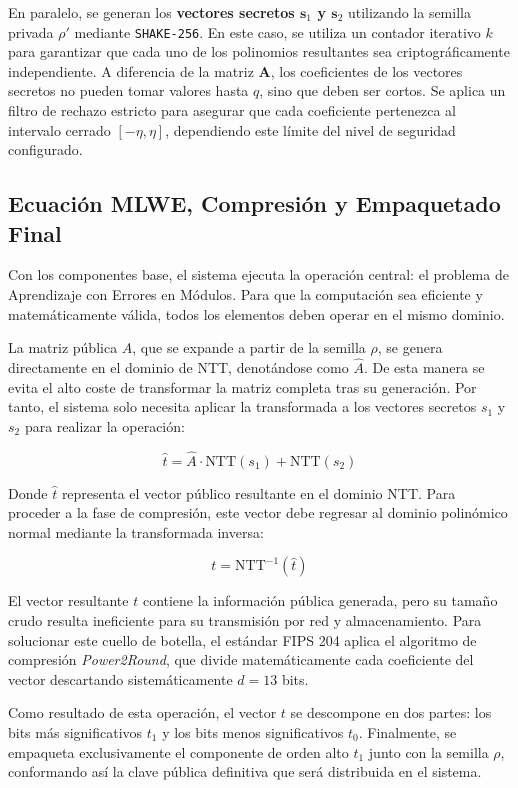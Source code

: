 \documentclass[11pt, a4paper]{report}
\theoremstyle{definition}
\begin{document}
En paralelo, se generan los \textbf{vectores secretos $\mathbf{s}_1$ y $\mathbf{s}_2$} utilizando la semilla privada $\rho'$ mediante \texttt{SHAKE-256}. En este caso, se utiliza un contador iterativo $k$ para garantizar que cada uno de los polinomios resultantes sea criptográficamente independiente. A diferencia de la matriz $\mathbf{A}$, los coeficientes de los vectores secretos no pueden tomar valores hasta $q$, sino que deben ser cortos. Se aplica un filtro de rechazo estricto para asegurar que cada coeficiente pertenezca al intervalo cerrado $[-\eta, \eta]$, dependiendo este límite del nivel de seguridad configurado.

\subsection{Ecuación MLWE, Compresión y Empaquetado Final}
\label{subsubsec:mlwe_empaquetado}

Con los componentes base, el sistema ejecuta la operación central: el problema de Aprendizaje con Errores en Módulos. Para que la computación sea eficiente y matemáticamente válida, todos los elementos deben operar en el mismo dominio.

La matriz pública $A$, que se expande a partir de la semilla $\rho$, se genera directamente en el dominio de NTT, denotándose como $\hat{A}$. De esta manera se evita el alto coste de transformar la matriz completa tras su generación. Por tanto, el sistema solo necesita aplicar la transformada a los vectores secretos $s_1$ y $s_2$ para realizar la operación:

\[ \hat{t} = \hat{A} \cdot \text{NTT}(s_1) + \text{NTT}(s_2) \]

Donde $\hat{t}$ representa el vector público resultante en el dominio NTT. Para proceder a la fase de compresión, este vector debe regresar al dominio polinómico normal mediante la transformada inversa:

\[ t = \text{NTT}^{-1}(\hat{t}) \]

El vector resultante $t$ contiene la información pública generada, pero su tamaño crudo resulta ineficiente para su transmisión por red y almacenamiento. Para solucionar este cuello de botella, el estándar FIPS 204 aplica el algoritmo de compresión \textit{Power2Round}, que divide matemáticamente cada coeficiente del vector descartando sistemáticamente $d = 13$ bits.

Como resultado de esta operación, el vector $t$ se descompone en dos partes: los bits más significativos $t_1$ y los bits menos significativos $t_0$. Finalmente, se empaqueta exclusivamente el componente de orden alto $t_1$ junto con la semilla $\rho$, conformando así la clave pública definitiva que será distribuida en el sistema.
\end{document}
